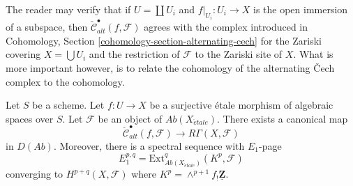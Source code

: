 \noindent
The reader may verify that if $U = \coprod U_i$ and $f|_{U_i} : U_i \to X$
is the open immersion of a subspace, then
$\check{\mathcal{C}}_{alt}^\bullet(f, \mathcal{F})$ agrees with the complex
introduced in
Cohomology, Section \ref{cohomology-section-alternating-cech}
for the Zariski covering $X = \bigcup U_i$ and the restriction
of $\mathcal{F}$ to the Zariski site of $X$. What is more important
however, is to relate the cohomology of the alternating
{\v C}ech complex to the cohomology.

\begin{lemma}
\label{lemma-alternating-cech-to-cohomology}
Let $S$ be a scheme. Let $f : U \to X$ be a surjective \'etale morphism
of algebraic spaces over $S$. Let $\mathcal{F}$ be an object of
$\textit{Ab}(X_{\acute{e}tale})$. There exists a canonical map
$$
\check{\mathcal{C}}^\bullet_{alt}(f, \mathcal{F})
\longrightarrow
R\Gamma(X, \mathcal{F})
$$
in $D(\textit{Ab})$. Moreover, there is a spectral sequence with $E_1$-page
$$
E_1^{p, q} =
\text{Ext}_{\textit{Ab}(X_{\acute{e}tale})}^q(K^p, \mathcal{F})
$$
converging to $H^{p + q}(X, \mathcal{F})$ where
$K^p = \wedge^{p + 1}f_!\underline{\mathbf{Z}}$.
\end{lemma}

